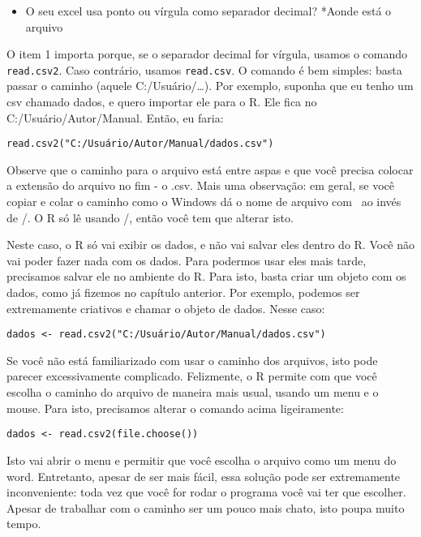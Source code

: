 \documentclass[]{book}
\providecommand{\tightlist}{%
  \setlength{\itemsep}{0pt}\setlength{\parskip}{0pt}}
\begin{document}
\begin{itemize}
\tightlist
\item
  O seu excel usa ponto ou vírgula como separador decimal? *Aonde está o
  arquivo
\end{itemize}

O item 1 importa porque, se o separador decimal for vírgula, usamos o
comando \texttt{read.csv2}. Caso contrário, usamos \texttt{read.csv}. O
comando é bem simples: basta passar o caminho (aquele
C:/Usuário/\ldots{}). Por exemplo, suponha que eu tenho um csv chamado
dados, e quero importar ele para o R. Ele fica no
C:/Usuário/Autor/Manual. Então, eu faria:

\begin{verbatim}
read.csv2("C:/Usuário/Autor/Manual/dados.csv")
\end{verbatim}

Observe que o caminho para o arquivo está entre aspas e que você precisa
colocar a extensão do arquivo no fim - o .csv. Mais uma observação: em
geral, se você copiar e colar o caminho como o Windows dá o nome de
arquivo com ~ao invés de /. O R só lê usando /, então você tem que
alterar isto.

Neste caso, o R só vai exibir os dados, e não vai salvar eles dentro do
R. Você não vai poder fazer nada com os dados. Para podermos usar eles
mais tarde, precisamos salvar ele no ambiente do R. Para isto, basta
criar um objeto com os dados, como já fizemos no capítulo anterior. Por
exemplo, podemos ser extremamente criativos e chamar o objeto de dados.
Nesse caso:

\begin{verbatim}
dados <- read.csv2("C:/Usuário/Autor/Manual/dados.csv")
\end{verbatim}

Se você não está familiarizado com usar o caminho dos arquivos, isto
pode parecer excessivamente complicado. Felizmente, o R permite com que
você escolha o caminho do arquivo de maneira mais usual, usando um menu
e o mouse. Para isto, precisamos alterar o comando acima ligeiramente:

\begin{verbatim}
dados <- read.csv2(file.choose())
\end{verbatim}

Isto vai abrir o menu e permitir que você escolha o arquivo como um menu
do word. Entretanto, apesar de ser mais fácil, essa solução pode ser
extremamente inconveniente: toda vez que você for rodar o programa você
vai ter que escolher. Apesar de trabalhar com o caminho ser um pouco
mais chato, isto poupa muito tempo.
\end{document}
